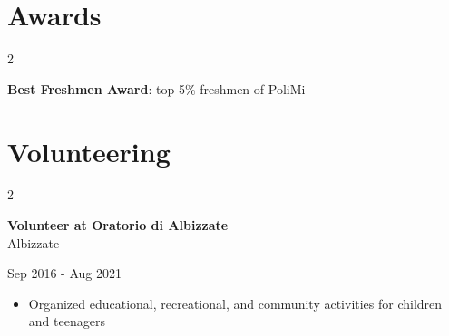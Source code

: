 \documentclass[10pt, letterpaper]{article}
\newenvironment{highlights}{
    \begin{itemize}[
        topsep=0.10 cm,
        parsep=0.10 cm,
        partopsep=0pt,
        itemsep=0pt,
        leftmargin=0.4 cm + 10pt
    ]
}{
    \end{itemize}
} %
\newenvironment{twocolentry}[2][]{
    \onecolentry
    \def\secondColumn{#2}
    \setcolumnwidth{\fill, 4.5 cm}
    \begin{paracol}{2}
}{
    \switchcolumn \raggedleft \secondColumn
    \end{paracol}
    \endonecolentry
} %
\begin{document}
\section{\mbox{{\color{black}\footnotesize\faTrophy}\hspace*{0.13cm}Awards}}
        \begin{twocolentry}{2023}
            \textbf{Best Freshmen Award}: top 5\% freshmen of PoliMi
        \end{twocolentry}

    \section{\mbox{{\color{black}\footnotesize\faSeedling}\hspace*{0.13cm}Volunteering}}
            
        \begin{twocolentry}{Sep 2016 - Aug 2021}
        \textbf{Volunteer at Oratorio di Albizzate}\\
        Albizzate
        \end{twocolentry}
        \begin{highlights}
    \item Organized educational, recreational, and community activities for children and teenagers
\end{highlights}
\end{document}
